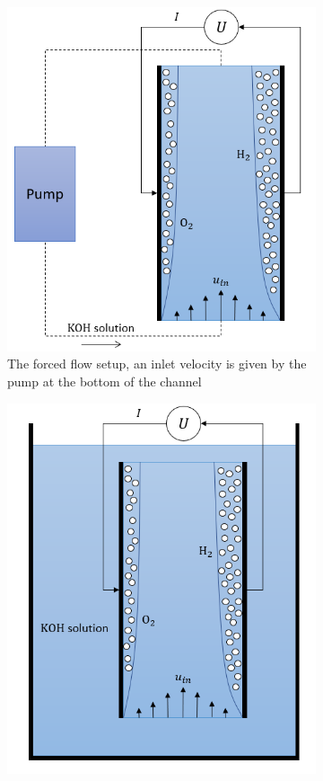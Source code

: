 \begin{figure}[H]
\centering
\begin{subfigure}{.4\textwidth}
  \centering
  \includegraphics[width=1\linewidth]{forcedflowsketch.png}
  \caption{The forced flow setup, an inlet velocity is given by the pump at the bottom of the channel}
  \label{forcedsetup}
\end{subfigure}%
\begin{subfigure}{.4\textwidth}
  \centering
  \includegraphics[width=1\linewidth]{buoyancydrivenflowsketch.png}

\end{subfigure}
\end{figure}
